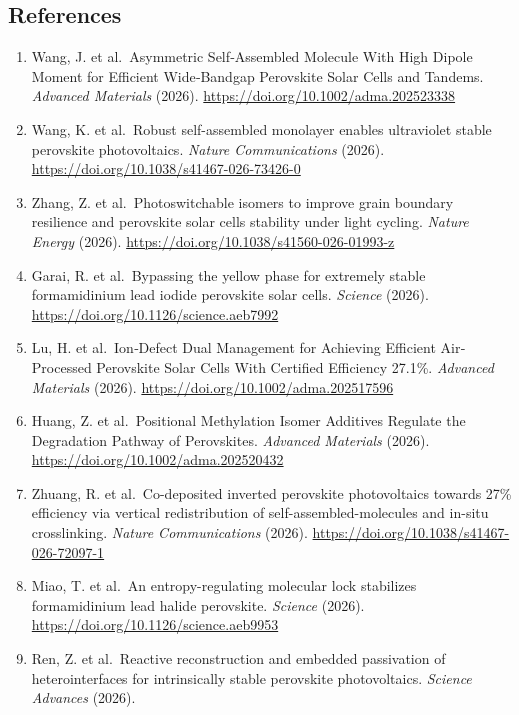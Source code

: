 \documentclass[
  11pt,
]{article}
\providecommand{\tightlist}{%
  \setlength{\itemsep}{0pt}\setlength{\parskip}{0pt}}
\begin{document}
\subsection{References}\label{references}

\begin{enumerate}
\def\labelenumi{\arabic{enumi}.}
\tightlist
\item
  Wang, J. et al.~Asymmetric Self‐Assembled Molecule With High Dipole
  Moment for Efficient Wide‐Bandgap Perovskite Solar Cells and Tandems.
  \emph{Advanced Materials} (2026).
  \url{https://doi.org/10.1002/adma.202523338}
\item
  Wang, K. et al.~Robust self-assembled monolayer enables ultraviolet
  stable perovskite photovoltaics. \emph{Nature Communications} (2026).
  \url{https://doi.org/10.1038/s41467-026-73426-0}
\item
  Zhang, Z. et al.~Photoswitchable isomers to improve grain boundary
  resilience and perovskite solar cells stability under light cycling.
  \emph{Nature Energy} (2026).
  \url{https://doi.org/10.1038/s41560-026-01993-z}
\item
  Garai, R. et al.~Bypassing the yellow phase for extremely stable
  formamidinium lead iodide perovskite solar cells. \emph{Science}
  (2026). \url{https://doi.org/10.1126/science.aeb7992}
\item
  Lu, H. et al.~Ion‐Defect Dual Management for Achieving Efficient
  Air‐Processed Perovskite Solar Cells With Certified Efficiency 27.1\%.
  \emph{Advanced Materials} (2026).
  \url{https://doi.org/10.1002/adma.202517596}
\item
  Huang, Z. et al.~Positional Methylation Isomer Additives Regulate the
  Degradation Pathway of Perovskites. \emph{Advanced Materials} (2026).
  \url{https://doi.org/10.1002/adma.202520432}
\item
  Zhuang, R. et al.~Co-deposited inverted perovskite photovoltaics
  towards 27\% efficiency via vertical redistribution of
  self-assembled-molecules and in-situ crosslinking. \emph{Nature
  Communications} (2026).
  \url{https://doi.org/10.1038/s41467-026-72097-1}
\item
  Miao, T. et al.~An entropy-regulating molecular lock stabilizes
  formamidinium lead halide perovskite. \emph{Science} (2026).
  \url{https://doi.org/10.1126/science.aeb9953}
\item
  Ren, Z. et al.~Reactive reconstruction and embedded passivation of
  heterointerfaces for intrinsically stable perovskite photovoltaics.
  \emph{Science Advances} (2026).

\end{enumerate}
\end{document}
